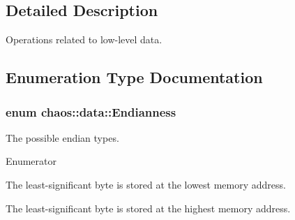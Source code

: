 \subsection{Detailed Description}
Operations related to low-\/level data. 

\subsection{Enumeration Type Documentation}
\hypertarget{namespacechaos_1_1data_adb2657d50c0b84cdc1153001031bbf3f}{}
\subsubsection[{Endianness}]{\setlength{\rightskip}{0pt plus 5cm}enum {\bf chaos\+::data\+::\+Endianness}}\label{namespacechaos_1_1data_adb2657d50c0b84cdc1153001031bbf3f}


The possible endian types. 

\begin{Desc}
\item[Enumerator]\par
\begin{description}
\item[{\em 
\hypertarget{namespacechaos_1_1data_adb2657d50c0b84cdc1153001031bbf3fa7fc5455bb6147c278dfa4a84e255c66d}{}E\+N\+D\+I\+A\+N\+\_\+\+L\+I\+T\+T\+L\+E\label{namespacechaos_1_1data_adb2657d50c0b84cdc1153001031bbf3fa7fc5455bb6147c278dfa4a84e255c66d}
}]The least-\/significant byte is stored at the lowest memory address. \item[{\em 
\hypertarget{namespacechaos_1_1data_adb2657d50c0b84cdc1153001031bbf3fa0e1ed99b965cedefe24534be309738ad}{}E\+N\+D\+I\+A\+N\+\_\+\+B\+I\+G\label{namespacechaos_1_1data_adb2657d50c0b84cdc1153001031bbf3fa0e1ed99b965cedefe24534be309738ad}
}]The least-\/significant byte is stored at the highest memory address. \end{description}
\end{Desc}
